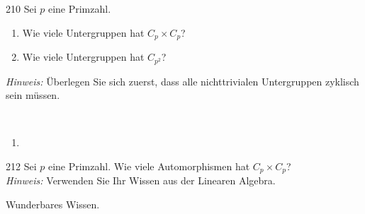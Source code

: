 \begin{algebraUE}{210}
Sei $p$ eine Primzahl.
\begin{enumerate}
  \item Wie viele Untergruppen hat $C_p \times C_p$?
  \item Wie viele Untergruppen hat $C_{p^2}$?
\end{enumerate}
\textit{Hinweis:} Überlegen Sie sich zuerst, dass alle nichttrivialen Untergruppen
zyklisch sein müssen.
\end{algebraUE}
\begin{solution}
\leavevmode \\
\begin{enumerate}
  \item
\end{enumerate}
\end{solution}


\begin{algebraUE}{212}
  Sei $p$ eine Primzahl. Wie viele Automorphismen hat $C_p \times C_p$? \\
  \textit{Hinweis:} Verwenden Sie Ihr Wissen aus der Linearen Algebra.
\end{algebraUE}
\begin{solution}
  Wunderbares Wissen.
\end{solution}

